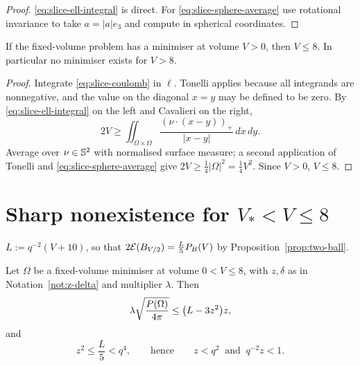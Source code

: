 \begin{proof}
\eqref{eq:slice-ell-integral} is direct.  For
\eqref{eq:slice-sphere-average} use rotational invariance to take
$a=|a|e_3$ and compute in spherical coordinates.
\end{proof}

\begin{proposition}\label{prop:V-le-8}
If the fixed-volume problem has a minimiser at volume $V>0$, then $V\le8$.  In
particular no minimiser exists for $V>8$.
\end{proposition}

\begin{proof}
Integrate \eqref{eq:slice-coulomb} in $\ell$.  Tonelli applies because all
integrands are nonnegative, and the value on the diagonal $x=y$ may be defined
to be zero.  By \eqref{eq:slice-ell-integral} on the left and Cavalieri on the
right,
\begin{equation}\label{eq:slice-after-ell}
  2V\ge\iint_{\Omega\times\Omega}\frac{(\nu\cdot(x-y))_+}{|x-y|}\,dx\,dy .
\end{equation}
Average over $\nu\in\mathbb S^2$ with normalised surface measure; a second
application of Tonelli and \eqref{eq:slice-sphere-average} give
$2V\ge\tfrac14|\Omega|^2=\tfrac14V^2$.  Since $V>0$, $V\le8$.
\end{proof}

\section{Sharp nonexistence for $V_*<V\le8$}

\begin{notation}\label{not:L}
$L:=q^{-2}(V+10)$, so that $2\mathcal E(B_{V/2})=\tfrac L5P_B(V)$ by
Proposition~\ref{prop:two-ball}.
\end{notation}

\begin{lemma}\label{lem:two-ball-comparison}
Let $\Omega$ be a fixed-volume minimiser at volume $0<V\le8$, with $z,\delta$
as in Notation~\ref{not:z-delta} and multiplier $\lambda$.  Then
\begin{equation}\label{eq:two-ball-lambda}
  \lambda\sqrt{\frac{P(\Omega)}{4\pi}}\le\bigl(L-3z^2\bigr)z ,
\end{equation}
and
\begin{equation}\label{eq:z-small}
  z^2\le\frac L5<q^4,
  \qquad\text{hence}\qquad
  z<q^2\ \text{ and }\ q^{-2}z<1 .
\end{equation}
\end{lemma}

